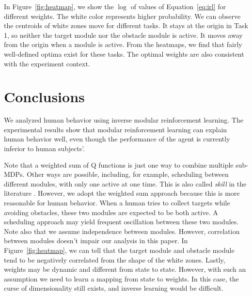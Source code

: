 \documentclass[11pt]{article} %
\begin{document}
In Figure~\ref{fig:heatmap}, we show the $\log$ of values of
Equation~\ref{eq:irl} for different weights. The white color represents higher
probability. We can observe the centroids of white zones move for different
tasks. It stays at the origin in Task 1, so neither the target module nor the
obstacle module is active. It moves away from the origin when a module is
active.  From the heatmaps, we find that fairly well-defined optima exist for
these tasks. The optimal weights are also consistent with the experiment
context.

\section{Conclusions}
\label{sec:conclude}

We analyzed human behavior using inverse modular reinforcement learning. The
experimental results show that modular reinforcement learning can explain human
behavior well, even though the performance of the agent is currently inferior to
human subjects'.

Note that a weighted sum of Q functions is just one way to combine multiple
sub-MDPs. Other ways are possible, including, for example, scheduling between
different modules, with only one active at one time. This is also called {\em
skill} in the literature \cite{konidaris2009skill}. However, we adopt the
weighted sum approach because this is more reasonable for human behavior. When a
human tries to collect targets while avoiding obstacles, these two modules are
expected to be both active. A scheduling approach may yield frequent oscillation
between these two modules. Note also that we assume independence between
modules. However, correlation between modules doesn't impair our analysis in
this paper. In Figure~\ref{fig:heatmap}, we can tell that the target module and
obstacle module tend to be negatively correlated from the shape of the white
zones. Lastly, weights may be dynamic and different from state to state.
However, with such an assumption we need to learn a mapping from state to
weights. In this case, the curse of dimensionality still exists, and inverse
learning would be difficult.



\end{document}
